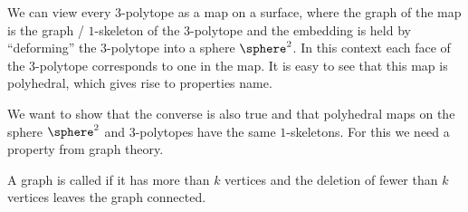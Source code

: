 \begin{remark}\label{rem:polymap:from:polyhedron}
  We can view every $3$-polytope as a map on a surface, where the graph of the map is the graph / $1$-skeleton of the $3$-polytope and the embedding is held by ``deforming'' the $3$-polytope into a sphere $\sphere^2$. In this context each face of the $3$-polytope corresponds to one in the map. It is easy to see that this map is polyhedral, which gives rise to properties name.
\end{remark}

We want to show that the converse is also true and that polyhedral maps on the sphere $\sphere^2$ and $3$-polytopes have the same $1$-skeletons. For this we need a property from graph theory.

\begin{definition} A graph is called  if it has more than $k$ vertices and the deletion of fewer than $k$ vertices leaves the graph connected.
\end{definition}

